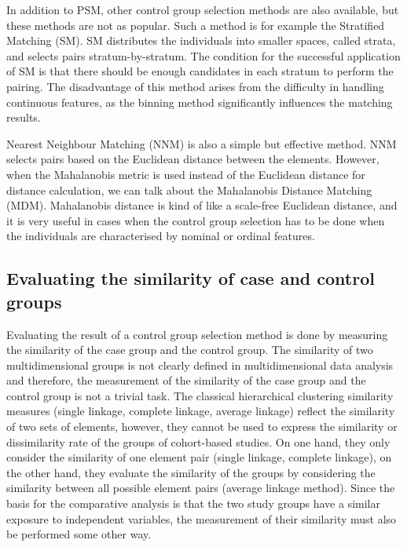 \label{sec:other_methods}

In addition to PSM, other control group selection methods are also available, but these methods are not as popular. Such a method is for example the Stratified Matching (SM). SM distributes the individuals into smaller spaces, called strata, and selects pairs stratum-by-stratum. The condition for the successful application of SM is that there should be enough candidates in each stratum to perform the pairing. The disadvantage of this method arises from the difficulty in handling continuous features, as the binning method significantly influences the matching results.

Nearest Neighbour Matching (NNM) is also a simple but effective method. NNM selects pairs based on the Euclidean distance between the elements. However, when the Mahalanobis metric is used instead of the Euclidean distance for distance calculation, we can talk about the Mahalanobis Distance Matching (MDM). Mahalanobis distance is kind of like a scale-free Euclidean distance, and it is very useful in cases when the control group selection has to be done when the individuals are characterised by nominal or ordinal features.

\subsection{Evaluating the similarity of case and control groups}
\label{sec:evaluating}

Evaluating the result of a control group selection method is done by measuring the similarity of the case group and the control group. The similarity of two multidimensional groups is not clearly defined in multidimensional data analysis and therefore, the measurement of the similarity of the case group and the control group is not a trivial task. The classical hierarchical clustering similarity measures (single linkage, complete linkage, average linkage) \cite{jain1988algorithms} reflect the similarity of two sets of elements, however, they cannot be used to express the similarity or dissimilarity rate of the groups of cohort-based studies. On one hand, they only consider the similarity of one element pair (single linkage, complete linkage), on the other hand, they evaluate the similarity of the groups by considering the similarity between all possible element pairs (average linkage method). Since the basis for the comparative analysis is that the two study groups have a similar exposure to independent variables, the measurement of their similarity must also be performed some other way.

